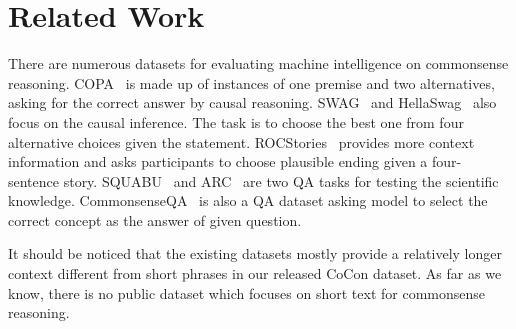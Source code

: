 \section{Related Work}

There are numerous datasets for evaluating machine intelligence on commonsense reasoning. COPA~\cite{roemmele2011choice} is made up of instances of one premise and two alternatives, asking for the correct answer by causal reasoning. SWAG~\cite{zellers2018swag} and HellaSwag~\cite{DBLP:journals/corr/abs-1905-07830} also focus on the causal inference. 
The task is to choose the best one from four alternative choices given the statement. ROCStories~\cite{mostafazadeh2016corpus} 
provides more context information and asks participants to choose plausible ending given a four-sentence story. SQUABU~\cite{davis2016write} and ARC~\cite{clark2018think} are two QA tasks for testing the scientific knowledge. CommonsenseQA~\cite{talmor2019commonsenseqa} is also a QA dataset asking model to select the correct concept as the answer of given question.%


It should be noticed that the existing datasets mostly provide a relatively longer context different from short phrases in our released CoCon dataset. As far as we know, there is no public dataset which focuses on short text for commonsense reasoning.

 

